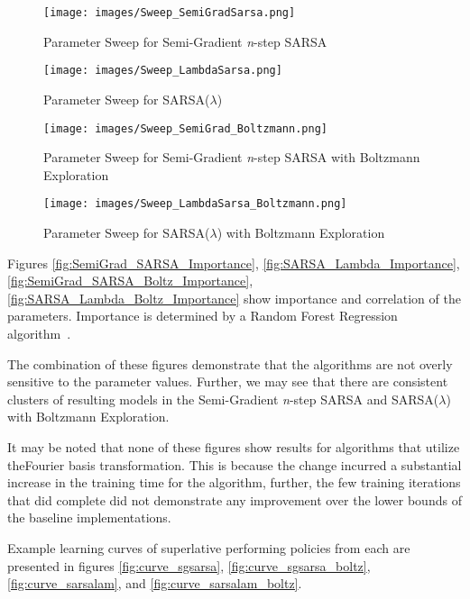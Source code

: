 \documentclass[journal]{IEEEtran}
\begin{document}
\begin{figure*}
  \texttt{[image: images/Sweep\_SemiGradSarsa.png]}
  \caption{Parameter Sweep for Semi-Gradient \emph{n}-step SARSA}
  \label{fig:SemiGrad_SARSA_Sweep}
\end{figure*}
\begin{figure*}
  \texttt{[image: images/Sweep\_LambdaSarsa.png]}
  \caption{Parameter Sweep for SARSA(\(\lambda\))}
  \label{fig:SARSA_Lambda_Sweep}
\end{figure*}
\begin{figure*}
  \texttt{[image: images/Sweep\_SemiGrad\_Boltzmann.png]}
  \caption{Parameter Sweep for Semi-Gradient \emph{n}-step SARSA with Boltzmann Exploration}
  \label{fig:SemiGrad_SARSA_Boltzmann_Sweep}
\end{figure*}
\begin{figure*}
  \texttt{[image: images/Sweep\_LambdaSarsa\_Boltzmann.png]}
  \caption{Parameter Sweep for SARSA(\(\lambda\)) with Boltzmann Exploration}
  \label{fig:SARSA_Lambda_Boltzmann_Sweep}
\end{figure*}

Figures \ref{fig:SemiGrad_SARSA_Importance}, \ref{fig:SARSA_Lambda_Importance},
\ref{fig:SemiGrad_SARSA_Boltz_Importance}, \ref{fig:SARSA_Lambda_Boltz_Importance}
show importance and correlation of the parameters.
Importance is determined by a Random Forest Regression algorithm~\cite{probst2019}.

The combination of these figures demonstrate that the algorithms are not overly sensitive to
the parameter values. Further, we may see that there are consistent clusters of resulting models
in the Semi-Gradient \emph{n}-step SARSA and SARSA(\(\lambda\)) with Boltzmann Exploration.

It may be noted that none of these figures show results for algorithms 
that utilize theFourier basis transformation. 
This is because the change incurred a substantial increase in the training time for the algorithm, 
further, the few training iterations that did complete did not demonstrate any improvement
over the lower bounds of the baseline implementations.

Example learning curves of superlative performing policies from each are presented in figures
\ref{fig:curve_sgsarsa}, \ref{fig:curve_sgsarsa_boltz}, \ref{fig:curve_sarsalam}, and
\ref{fig:curve_sarsalam_boltz}.
\end{document}
